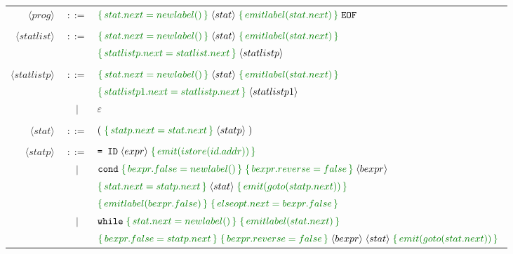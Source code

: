 \documentclass[a4paper]{article}
\newcommand{\cmd}[1]{\textcolor{MyGreen}{\{\, #1 \,\}} \;}
\newcommand{\node}[1]{\langle #1 \rangle \;}
\newcommand{\tag}[1]{\texttt{#1} \;}
\begin{document}
\begin{center}
\begin{tabular}{ r c l }
  $\node{prog}$       & $::=$ & $\cmd{stat.next = newlabel()} \node{stat} \cmd{emitlabel(stat.next)} \tag{EOF}$ \\\\
  $\node{statlist}$   & $::=$ & $\cmd{stat.next = newlabel()} \node{stat} \cmd{emitlabel(stat.next)}$ \\
                      &       & $\cmd{statlistp.next = statlist.next}\node{statlistp}$ \\\\
  $\node{statlistp}$  & $::=$ & $\cmd{stat.next = newlabel()} \node{stat} \cmd{emitlabel(stat.next)}$ \\
                      &       & $\cmd{statlistp1.next = statlistp.next}\node{statlistp1}$ \\

                      &  $|$  & $\varepsilon$ \\\\
  $\node{stat}$       & $::=$ & $(\; \cmd{statp.next = stat.next} \node{statp})$ \\\\
  $\node{statp}$      & $::=$ & $\texttt{= ID}\; \node{expr} \cmd{emit(istore(id.addr))}$ \\

                      &  $|$  & $\tag{cond} \cmd{bexpr.false = newlabel()} \cmd{bexpr.reverse = false} \node{bexpr}$ \\
                      &       & $\cmd{stat.next = statp.next} \node{stat} \cmd{emit(goto(statp.next))}$ \\
                      &       & $\cmd{emitlabel(bexpr.false)} \cmd{elseopt.next = bexpr.false}$ \\

                      &  $|$  & $\tag{while} \cmd{stat.next = newlabel()} \cmd{emitlabel(stat.next)}$ \\
                      &       & $\cmd{bexpr.false = statp.next} \cmd{bexpr.reverse = false} \node{bexpr} \node{stat} \cmd{emit(goto(stat.next))}$ \\


\end{tabular}
\end{center}
\end{document}
